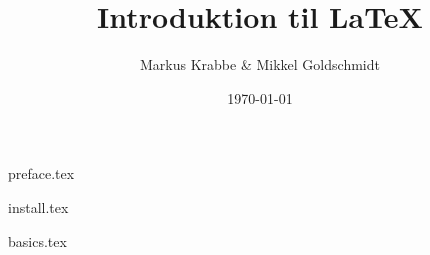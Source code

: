 \documentclass[titlepage]{article}
\title{Introduktion til \LaTeX{} }
\author{Markus Krabbe \& Mikkel Goldschmidt}
\date{\today}
\begin{document}
\maketitle

\tableofcontents
\clearpage

{preface.tex}


\setcounter{section}{-1} %

{install.tex}

{basics.tex}
\end{document}
